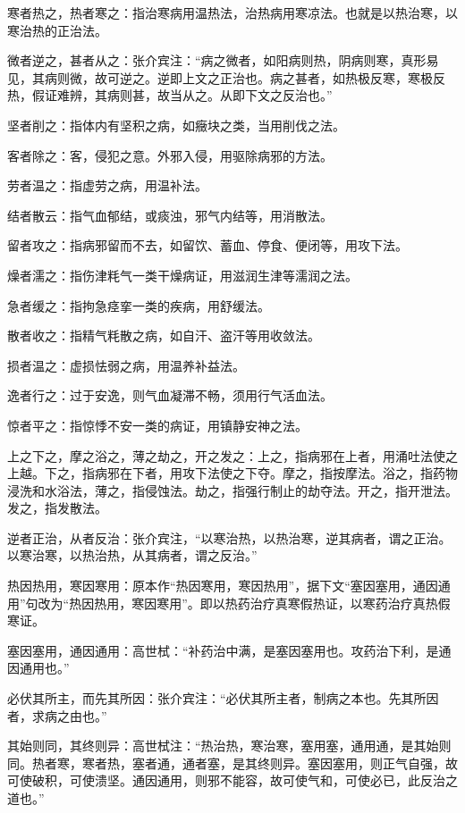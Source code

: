 \documentclass[draft,12pt]{ctexbook}
\begin{document}
\begin{jiaozhu}
	\item 寒者热之，热者寒之：指治寒病用温热法，治热病用寒凉法。也就是以热治寒，以寒治热的正治法。
	\item 微者逆之，甚者从之：张介宾注：“病之微者，如阳病则热，阴病则寒，真形易见，其病则微，故可逆之。逆即上文之正治也。病之甚者，如热极反寒，寒极反热，假证难辨，其病则甚，故当从之。从即下文之反治也。”
	\item 坚者削之：指体内有坚积之病，如癥块之类，当用削伐之法。
	\item 客者除之：客，侵犯之意。外邪入侵，用驱除病邪的方法。
	\item 劳者温之：指虚劳之病，用温补法。
	\item 结者散云：指气血郁结，或痰浊，邪气内结等，用消散法。
	\item 留者攻之：指病邪留而不去，如留饮、蓄血、停食、便闭等，用攻下法。
	\item 燥者濡之：指伤津粍气一类干燥病证，用滋润生津等濡润之法。
	\item 急者缓之：指拘急痉挛一类的疾病，用舒缓法。
	\item 散者收之：指精气粍散之病，如自汗、盗汗等用收敛法。
	\item 损者温之：虚损怯弱之病，用温养补益法。
	\item 逸者行之：过于安逸，则气血凝滞不畅，须用行气活血法。
	\item 惊者平之：指惊悸不安一类的病证，用镇静安神之法。
	\item 上之下之，摩之浴之，薄之劫之，开之发之：上之，指病邪在上者，用涌吐法使之上越。下之，指病邪在下者，用攻下法使之下夺。摩之，指按摩法。浴之，指药物浸洗和水浴法，薄之，指侵蚀法。劫之，指强行制止的劫夺法。开之，指开泄法。发之，指发散法。
	\item 逆者正治，从者反治：张介宾注，“以寒治热，以热治寒，逆其病者，谓之正治。以寒治寒，以热治热，从其病者，谓之反治。”
	\item 热因热用，寒因寒用：原本作“热因寒用，寒因热用”，据下文“塞因塞用，通因通用”句改为“热因热用，寒因寒用”。即以热药治疗真寒假热证，以寒药治疗真热假寒证。
	\item 塞因塞用，通因通用：高世栻：“补药治中满，是塞因塞用也。攻药治下利，是通因通用也。”
	\item 必伏其所主，而先其所因：张介宾注：“必伏其所主者，制病之本也。先其所因者，求病之由也。”
	\item 其始则同，其终则异：高世栻注：“热治热，寒治寒，塞用塞，通用通，是其始则同。热者寒，寒者热，塞者通，通者塞，是其终则异。塞因塞用，则正气自强，故可使破积，可使溃坚。通因通用，则邪不能容，故可使气和，可使必已，此反治之道也。”

\end{jiaozhu}
\end{document}
